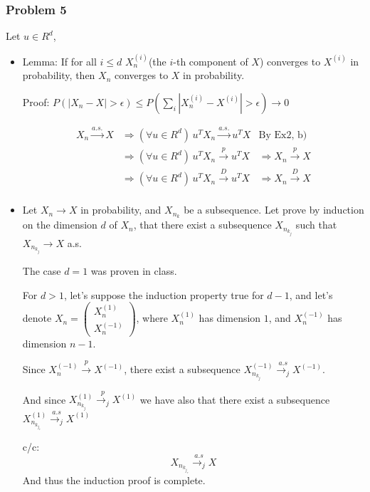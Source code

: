 \documentclass[12pt]{article}
\newcommand{\Q}[1]{\subsubsection*{Problem #1}}
\newcommand{\icol}[1]{%
  \left(\begin{smallmatrix}#1\end{smallmatrix}\right)%
}
\begin{document}
\Q{5}Let $u \in R^d$,
\begin{itemize}
\item
  Lemma: If for all $i \le d$ $X_n^{(i)}$(the $i$-th component of $X$) converges  to $X^{(i)}$ in probability, then $X_n$ converges to $X$ in probability.
  
  Proof: $P(|X_n - X| > \epsilon) \le P(\sum_i |X_n^{(i)} - X^{(i)}| > \epsilon) \rightarrow 0$
  
  \begin{align*}
    X_n \overset{a.s.}{\rightarrow} X
    & \Rightarrow (\forall u \in R^d )\, u^TX_n \overset{a.s.}{\rightarrow} u^TX & \text{By Ex2, b)}\\
    &\Rightarrow  (\forall u \in R^d )\,u^TX_n \overset{p}{\rightarrow} u^TX & \Rightarrow X_n \overset{p}{\rightarrow} X 
    \\&\Rightarrow  (\forall u \in R^d )\,u^TX_n \overset{D}{\rightarrow} u^TX & \Rightarrow X_n\overset{D}{\rightarrow} X\\
  \end{align*}
  
\item Let $X_n \rightarrow X$ in probability, and $X_{n_k}$ be a subsequence.
  Let prove by induction on the dimension $d$ of $X_n$, that there exist a subsequence $X_{n_{k_j}}$ such that $X_{n_{k_j}} \rightarrow X$ a.s.

  The case $d = 1$ was proven in class.

  For $d > 1$, let's suppose the induction property true for $d-1$, and let's denote $X_n = \icol{X_n^{(1)}\\X_n^{(-1)}}$, where $X_n^{(1)}$ has dimension $1$, and $X_n^{(-1)}$ has dimension $n-1$.

  Since $X_n^{(-1)} \overset{p}{\rightarrow} X^{(-1)}$, there exist a subsequence $X_{n_{k_j}}^{(-1)} \overset{a.s}{\rightarrow_j} X^{(-1)}$.

  And since $ X_{n_{k_j}}^{(1)} \overset{p}{\rightarrow_j} X^{(1)}$ we have also that there exist a subsequence $X^{(1)}_{n_{k_{j_r}}} \overset{a.s}{\rightarrow_j} X^{(1)}$
  
  c/c: $$X_{n_{k_{j_r}}} \overset{a.s}{\rightarrow_j} X$$
And thus the induction proof is complete.
\end{itemize}
\end{document}

